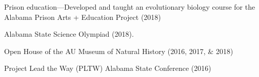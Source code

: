 \begin{veryTightItemize}
    \item Prison education---Developed and taught an evolutionary biology
        course for the Alabama Prison Arts + Education Project (2018)
    \item Alabama State Science Olympiad (2018).
    \item Open House of the AU Museum of Natural History (2016, 2017, \& 2018)
    \item Project Lead the Way (PLTW) Alabama State Conference (2016)
\end{veryTightItemize}

